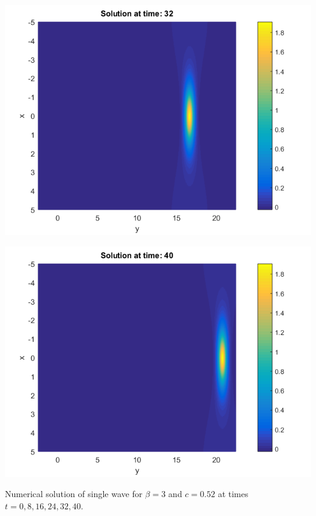 \documentclass{beamer}
\begin{document}
\begin{frame}
\begin{center}
\begin{minipage}[b]{0.30\linewidth}
		 \includegraphics[width=\linewidth]{../amitans/figures/Solution_bt3_t=32.png}
	\end{minipage}
	\begin{minipage}[b]{0.30\linewidth}
		 \includegraphics[width=\linewidth]{../amitans/figures/Solution_bt3_t=40.png}
	\end{minipage}
\end{center}
Numerical solution of single wave for $\beta=3$ and $c = 0.52$ at times $t=0,8,16,24,32,40$.
\end{frame}

\end{document}

